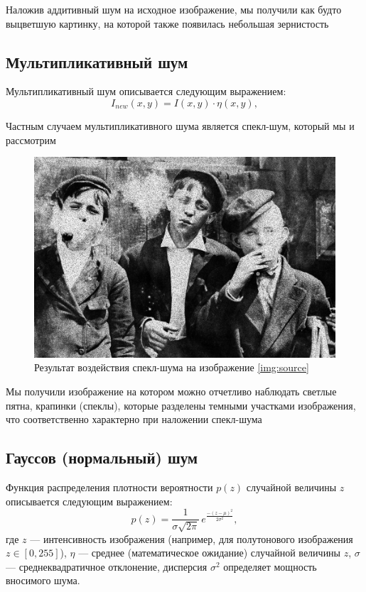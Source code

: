 Наложив аддитивный шум на исходное изображение, мы получили как будто выцветшую картинку, на которой также появилась небольшая зернистость

\subsection{Мультипликативный шум}
Мультипликативный шум описывается следующим выражением:
\begin{equation}
    I_{new}(x,y) = I(x,y) \cdot \eta(x,y),
\end{equation}

Частным случаем мультипликативного шума является спекл-шум, который мы и рассмотрим

\begin{figure}[ht!]
    \centering
    \includegraphics[width=\textwidth]{../Noisy_images/Speckle_noise.jpg}
    \caption{Результат воздействия спекл-шума на изображение \ref{img:source}}
    \label{img:speckle_noise}
\end{figure}
\FloatBarrier

Мы получили изображение на котором можно отчетливо наблюдать светлые пятна, крапинки (спеклы), которые разделены темными участками изображения, что соответственно характерно при наложении спекл-шума

\subsection{Гауссов (нормальный) шум}
Функция распределения плотности вероятности
$p(z)$ случайной величины $z$ описывается следующим выражением:
\begin{equation}
    p(z)= \frac{1}{\sigma\sqrt{2\pi}}\, e^{\frac{-(z-\mu)^2}{2\sigma^2}},
\end{equation}
где $z$ — интенсивность изображения (например, для полутонового изображения $z \in [0,255]$), $\eta$ — среднее (математическое ожидание) случайной величины $z$, $\sigma$ — среднеквадратичное отклонение, дисперсия $\sigma^2$ определяет мощность вносимого шума.


